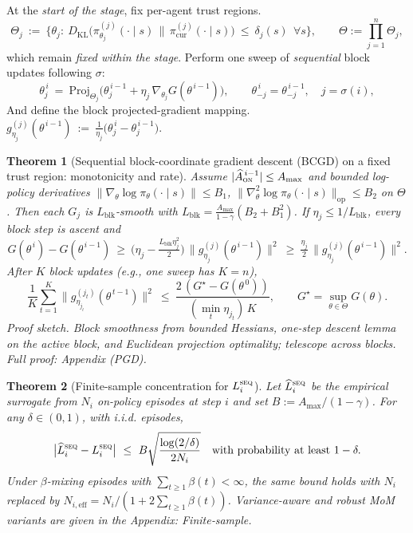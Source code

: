 \documentclass[sigconf]{aamas}
\newcommand{\Proj}{\mathrm{Proj}}
\newtheorem{theorem}{Theorem}[section]
\newcommand{\KL}{D_{\mathrm{KL}}}
\begin{document}
At the \emph{start of the stage}, fix per-agent trust regions.
\[
\Theta_j\ :=\ \Big\{\theta_j:\ \KL\!\Big(\pi^{(j)}_{\theta_j}(\cdot\mid s)\,\big\|\,\pi^{(j)}_{\mathrm{cur}}(\cdot\mid s)\Big)\ \le\ \delta_j(s)\ \ \forall s\Big\},
\qquad \Theta:=\prod_{j=1}^n\Theta_j,
\]
which remain \emph{fixed within the stage}. Perform one sweep of \emph{sequential} block updates following $\sigma$:
\[
\theta_{j}^{\,i}\ =\ \Proj_{\Theta_j}\!\Big(\theta_{j}^{\,i-1}+\eta_j\,\nabla_{\theta_j}G(\theta^{\,i-1})\Big),\qquad
\theta_{-j}^{\,i}=\theta_{-j}^{\,i-1},\quad j=\sigma(i),
\]
And define the block projected-gradient mapping.
$
g_{\eta_j}^{(j)}(\theta^{\,i-1})\ :=\ \tfrac{1}{\eta_j}\big(\theta_{j}^{\,i}-\theta_{j}^{\,i-1}\big).
$

\begin{theorem}[Sequential block-coordinate gradient descent (BCGD) on a fixed trust region: monotonicity and rate]
\label{thm:convergence}
Assume $|\widehat A^{\,i-1}_{\textsc{on}}|\le A_{\max}$ and bounded log-policy derivatives
$\|\nabla_{\theta}\log\pi_{\theta}(\cdot\mid s)\|\le B_1$,
$\|\nabla_{\theta}^2\log\pi_{\theta}(\cdot\mid s)\|_{\mathrm{op}}\le B_2$
on $\Theta$.
Then each $G_j$ is $L_{\mathrm{blk}}$-smooth with
$L_{\mathrm{blk}}=\frac{A_{\max}}{1-\gamma}(B_2+B_1^2)$.
If $\eta_j\le 1/L_{\mathrm{blk}}$, every block step is ascent and
\[
G(\theta^{\,i})-G(\theta^{\,i-1})
\ \ge\ \Big(\eta_j-\tfrac{L_{\mathrm{blk}}\eta_j^2}{2}\Big)\,\big\|g_{\eta_j}^{(j)}(\theta^{\,i-1})\big\|^2
\ \ge\ \tfrac{\eta_j}{2}\,\big\|g_{\eta_j}^{(j)}(\theta^{\,i-1})\big\|^2.
\]
After $K$ block updates (e.g., one sweep has $K=n$),
\[
\frac{1}{K}\sum_{t=1}^{K}\big\|g_{\eta_{j_t}}^{(j_t)}(\theta^{\,t-1})\big\|^2
\ \le\ \frac{2\,(G^\star-G(\theta^{\,0}))}{(\min_t \eta_{j_t})\,K},\qquad
G^\star=\sup_{\theta\in\Theta}G(\theta).
\]
\emph{Proof sketch.} Block smoothness from bounded Hessians, one-step descent lemma on the active block, and Euclidean projection optimality; telescope across blocks. Full proof: Appendix (PGD).
\end{theorem}

\begin{theorem}[Finite-sample concentration for $L_i^{\textsc{seq}}$]
\label{thm:finite-sample}
Let $\widehat{L}_i^{\textsc{seq}}$ be the empirical surrogate from $N_i$ on-policy episodes at step $i$ and set $B:=A_{\max}/(1-\gamma)$. For any $\delta\in(0,1)$, with i.i.d. episodes,
\[
\big|\widehat L_i^{\textsc{seq}}-L_i^{\textsc{seq}}\big|
\ \le\ B\sqrt{\frac{\log(2/\delta)}{2N_i}}
\quad\text{with probability at least }1-\delta.
\]
Under $\beta$-mixing episodes with $\sum_{t\ge1}\beta(t)<\infty$, the same bound holds with
$N_i$ replaced by $N_{i,\mathrm{eff}}=N_i/(1+2\sum_{t\ge1}\beta(t))$.
Variance-aware and robust MoM variants are given in the Appendix: Finite‑sample.
\end{theorem}
\end{document}
